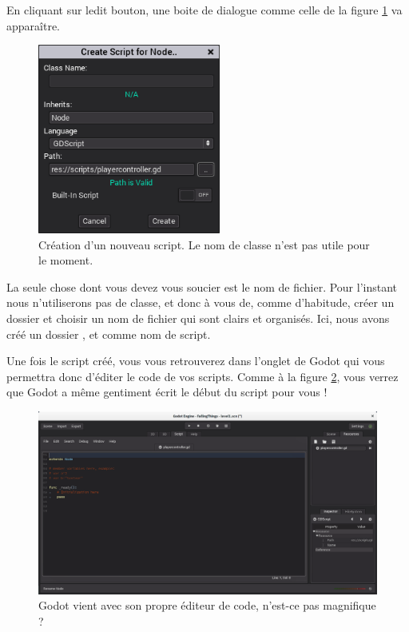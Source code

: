 En cliquant sur ledit bouton, une boite de dialogue comme celle de la figure \ref{lvl1-createscript} va apparaître.

\begin{figure}
  \begin{center}
    \includegraphics[width=6cm]{img/lvl1-createscript.png}
  \end{center}
  \caption{\label{lvl1-createscript} Création d'un nouveau script. Le nom de classe n'est pas utile pour le moment.}
\end{figure}

La seule chose dont vous devez vous soucier est le nom de fichier. Pour l'instant nous n'utiliserons pas de classe, et donc à vous de, comme d'habitude, créer un dossier et choisir un nom de fichier qui sont clairs et organisés. Ici, nous avons créé un dossier , et  comme nom de script.

Une fois le script créé, vous vous retrouverez dans l'onglet  de Godot qui vous permettra donc d'éditer le code de vos scripts. Comme à la figure \ref{lvl1-codeeditor}, vous verrez que Godot a même gentiment écrit le début du script pour vous !

\begin{figure}
  \begin{center}
    \includegraphics[width=12cm]{img/lvl1-codeeditor.png}
  \end{center}
  \caption{\label{lvl1-codeeditor} Godot vient avec son propre éditeur de code, n'est-ce pas magnifique ?}
\end{figure}

